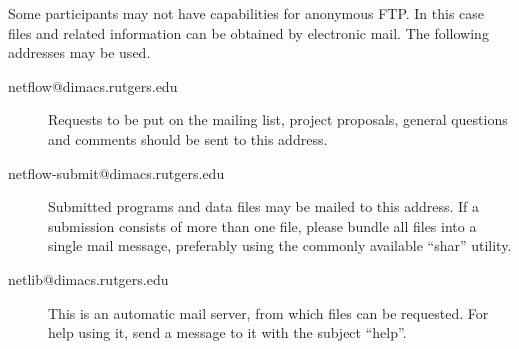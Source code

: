 Some participants may not have capabilities for anonymous FTP.  In this
case files and related information can be obtained by electronic mail.
The following addresses may be used.  
\begin{description}
\item[netflow@dimacs.rutgers.edu] Requests to be put on the mailing list,
project proposals, general questions and comments should be sent to this 
address. 

\item[netflow-submit@dimacs.rutgers.edu] Submitted programs and data files may
be mailed to this address.  If a submission consists of more than one file,
please bundle all files into a single mail message, preferably using the
commonly available ``shar'' utility.

\item[netlib@dimacs.rutgers.edu] This is an automatic mail server, from which
files can be requested.  For help using it, send a message to it with the
subject ``help''.


\end{description} 





